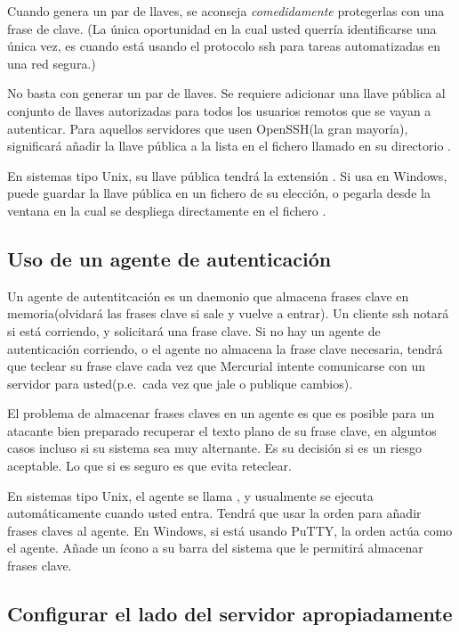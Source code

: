 Cuando genera un par de llaves, se aconseja \emph{comedidamente} 
protegerlas con una frase de clave.  (La única oportunidad en la cual
usted querría identificarse una única vez, es cuando está usando
el protocolo ssh para tareas automatizadas en una red segura.)

No basta con generar un par de llaves.  Se requiere adicionar una llave
pública al conjunto de llaves autorizadas para todos los usuarios
remotos que se vayan a autenticar.  Para aquellos servidores que usen
OpenSSH(la gran mayoría), significará añadir la llave pública a la
lista en el fichero llamado  en su
directorio .

En sistemas tipo Unix, su llave pública tendrá la extensión
.  Si usa  en Windows, puede
guardar la llave pública en un fichero de su elección, o pegarla desde
la ventana en la cual se despliega directamente en el fichero
.

\subsection{Uso de un agente de autenticación}

Un agente de autentitcación es un daemonio que almacena frases clave en
memoria(olvidará las frases clave si sale y vuelve a entrar).  Un cliente
ssh notará si está corriendo, y solicitará una frase clave.  Si no hay
un agente de autenticación corriendo, o el agente no almacena la frase
clave necesaria, tendrá que teclear su frase clave cada vez que 
Mercurial intente comunicarse con un servidor para usted(p.e.~cada vez
que jale o publique cambios).

El problema de almacenar frases claves en un agente es que es posible
para un atacante bien preparado recuperar el texto plano de su frase
clave, en alguntos casos incluso si su sistema sea muy alternante.
Es su decisión si es un riesgo aceptable.  Lo que si es seguro es que
evita reteclear.

En sistemas tipo Unix, el agente se llama , y
usualmente se ejecuta automáticamente cuando usted entra.  Tendrá que
usar la orden  para añadir frases claves al agente.  En
Windows, si está usando PuTTY, la orden  actúa como
el agente.  Añade un ícono a su barra del sistema que le permitirá
almacenar frases clave.

\subsection{Configurar el lado del servidor apropiadamente}

